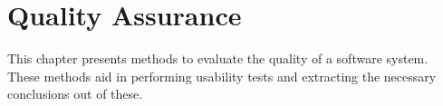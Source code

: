 \chapter{Quality Assurance}
This chapter presents methods to evaluate the quality of a software system. These methods aid in performing usability tests and extracting the necessary conclusions out of these.


%


